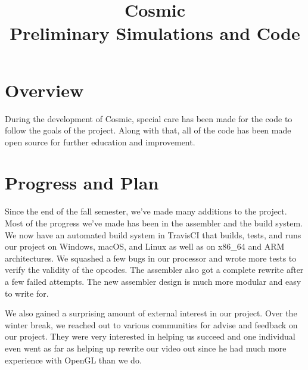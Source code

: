 \documentclass[conference]{IEEEtran}
\begin{document}
\title{
 Cosmic\\Preliminary Simulations and Code}

\author{
\and
{}

}

\maketitle

\section{Overview}
During the development of Cosmic, special care has been made for the code to follow the goals of the project. Along with that, all of the code has been made open source for further education and improvement.

\section{Progress and Plan}
Since the end of the fall semester, we've made many additions to the project. Most of the progress we've made has been in the assembler and the build system. We now have an automated build system in TravisCI that builds, tests, and runs our project on Windows, macOS, and Linux as well as on x86\_64 and ARM architectures. We squashed a few bugs in our processor and wrote more tests to verify the validity of the opcodes. The assembler also got a complete rewrite after a few failed attempts. The new assembler design is much more modular and easy to write for.

We also gained a surprising amount of external interest in our project. Over the winter break, we reached out to various communities for advise and feedback on our project. They were very interested in helping us succeed and one individual even went as far as helping up rewrite our video out since he had much more experience with OpenGL than we do.
\end{document}
